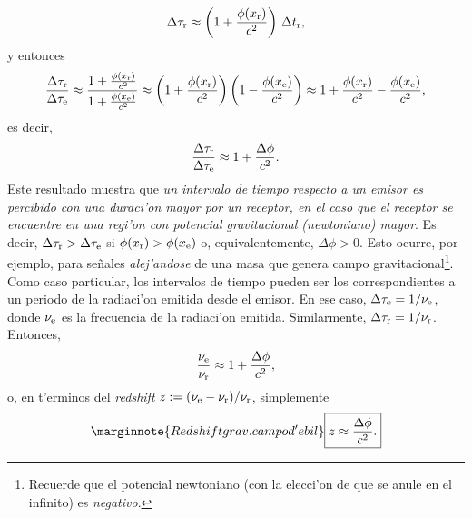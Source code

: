 \begin{equation}
 \Delta\tau_{\rm r}\approx \left(1+\frac{\phi(x_{\rm r})}{c^2}\right)\, \Delta t_{\rm r},
\end{equation}
y entonces
\begin{equation}\label{zapp1}
\frac{\Delta\tau_{\rm r}}{\Delta\tau_{\rm e}} \approx \frac{1+\frac{\phi(x_{\rm r})}{c^2}}{1+\frac{\phi(x_{\rm e})}{c^2}}\approx \left(1+\frac{\phi(x_{\rm r})}{c^2}\right)\left(1-\frac{\phi(x_{\rm e})}{c^2}\right)\approx 1+\frac{\phi(x_{\rm r})}{c^2}-\frac{\phi(x_{\rm e})}{c^2},
\end{equation}
es decir,
\begin{equation}\label{zapp2}
\frac{\Delta\tau_{\rm r}}{\Delta\tau_{\rm e}} \approx 1+\frac{\Delta \phi}{c^2}.
\end{equation}
Este resultado muestra que \textit{un intervalo de tiempo respecto a un emisor es percibido con una duraci'on mayor por un receptor, en el caso que el receptor se encuentre en una regi'on con potencial gravitacional (newtoniano) mayor}. Es decir, $\Delta\tau_{\rm r}>\Delta\tau_{\rm e}$ si $\phi(x_{\rm r})>\phi(x_{\rm e})$ o, equivalentemente, $\Delta\phi>0$. Esto ocurre, por ejemplo, para se\~nales \textit{alej'andose} de una masa que genera campo gravitacional\footnote{Recuerde que el potencial newtoniano (con la elecci'on de que se anule en el infinito) es \textit{negativo}.}. Como caso particular, los intervalos de tiempo pueden ser los correspondientes a un periodo de la radiaci'on emitida desde el emisor. En ese caso, $\Delta \tau_{\rm e}=1/\nu_{\rm e}$, donde $\nu_{\rm e}$ es la frecuencia de la radiaci'on emitida. Similarmente, $\Delta \tau_{\rm r}=1/\nu_{\rm r}$. Entonces,
\begin{equation}
\frac{\nu_{\rm e}}{\nu_{\rm r}} \approx 1+\frac{\Delta \phi}{c^2},
\end{equation}
o, en t'erminos del \textit{redshift} $z:=(\nu_{\rm e}-\nu_{\rm r})/\nu_{\rm r}$, simplemente
\begin{equation}\marginnote{Redshift grav. campo d'ebil}
\boxed{z \approx \frac{\Delta \phi}{c^2}.}\label{znorel}
\end{equation}

